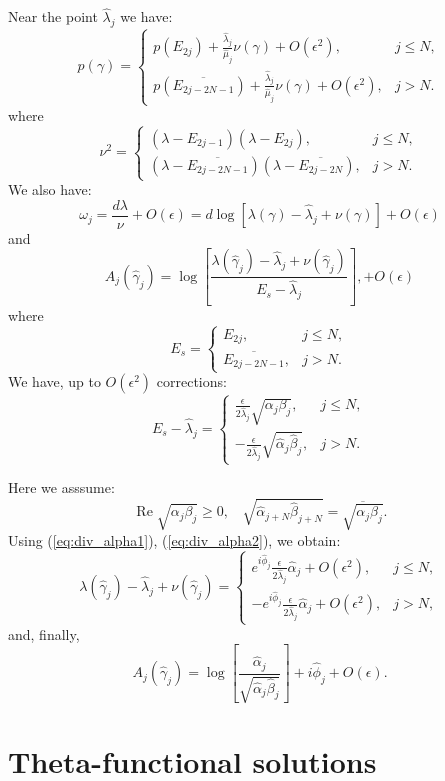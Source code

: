 \documentclass[12pt]{article}
\renewcommand{\Re}{\mathop{\mathrm{Re}}}
\begin{document}
Near the point $\hat\lambda_j$ we have:
$$
p(\gamma) = \left\{ \begin{array}{ll} p(E_{2j})+\frac{\hat\lambda_j}{\hat\mu_j}\nu(\gamma)+O(\epsilon^2), & j\le N, \\ 
p(\overline{E_{2j-2N-1}})+\frac{\hat\lambda_j}{\hat\mu_j}\nu(\gamma)+O(\epsilon^2),  & j > N.
     \end{array} \right. 
$$
where
$$
\nu^2=\left\{ \begin{array}{ll} (\lambda-E_{2j-1}) (\lambda-E_{2j}), &  j\le N, \\ 
(\lambda-\overline{E_{2j-2N-1}}) (\lambda-\overline{E_{2j-2N}}), & j>N.
      \end{array} \right.
$$
We also have:
$$
\omega_j = \frac{d\lambda}{\nu}+O(\epsilon) = d\log\left[\lambda(\gamma)-\hat\lambda_j+\nu(\gamma)   \right]+O(\epsilon)
$$
and 
$$
A_j(\hat\gamma_j) = \log\left[\frac{\lambda(\hat\gamma_j)-\hat\lambda_j+\nu(\hat\gamma_j)}{E_s-\hat\lambda_j} \right],
+O(\epsilon)
$$
where
$$
E_s=\left\{ \begin{array}{ll} E_{2j}, & j\le N, \\ \overline{E_{2j-2N-1}}, & j>N.  \end{array}\right.
$$
We have, up to $O(\epsilon^2)$ corrections:
$$
E_s-\hat\lambda_j=\left\{ \begin{array}{ll} \frac{\epsilon}{2\hat\lambda_j} \sqrt{\alpha_j\beta_j}, & j\le N,  \\
                            -\frac{\epsilon}{2\hat\lambda_{j} }\sqrt{\hat\alpha_{j}\hat\beta_{j}}, & j > N.  
       \end{array}\right.
$$

Here we asssume:
$$
\Re  \sqrt{\alpha_j\beta_j}\ge 0, \ \ \ \ \sqrt{\hat\alpha_{j+N}\hat\beta_{j+N}} =\overline{\sqrt{\alpha_j\beta_j}}.
$$
Using (\ref{eq:div_alpha1}), (\ref{eq:div_alpha2}), we obtain:
$$
\lambda(\hat\gamma_j)-\hat\lambda_j+\nu(\hat\gamma_j)=\left\{ \begin{array}{ll} 
e^{i\hat\phi_j}\frac{\epsilon}{2\hat\lambda_j} \hat\alpha_j+O(\epsilon^2), & j\le N , \\
-e^{i\hat\phi_j} \frac{\epsilon}{2\hat\lambda_{j}} \hat\alpha_{j}+O(\epsilon^2),  & j > N, \end{array}\right.
$$
and, finally,
$$
A_j(\hat\gamma_j) = 
\log\left[\frac{\hat\alpha_j}{\sqrt{\hat\alpha_j\hat\beta_j}} \right]+i\hat\phi_j + O(\epsilon).
$$

\section{Theta-functional solutions}
\label{sec:sec6}
\end{document}
